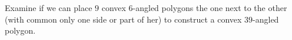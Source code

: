 Examine if we can place $9$ convex $6$-angled polygons the one next to the other (with common only one side or part of her) to construct a convex $39$-angled polygon.